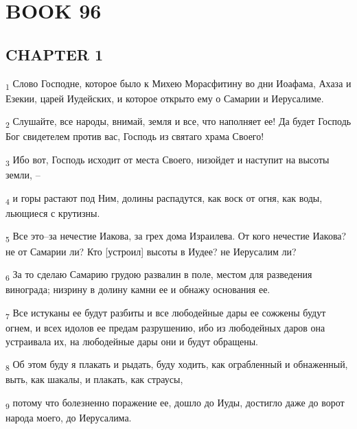 \section{BOOK 96}
\subsection{CHAPTER 1}
\begin{tcolorbox}
\textsubscript{1} Слово Господне, которое было к Михею Морасфитину во дни Иоафама, Ахаза и Езекии, царей Иудейских, и которое открыто ему о Самарии и Иерусалиме.
\end{tcolorbox}
\begin{tcolorbox}
\textsubscript{2} Слушайте, все народы, внимай, земля и все, что наполняет ее! Да будет Господь Бог свидетелем против вас, Господь из святаго храма Своего!
\end{tcolorbox}
\begin{tcolorbox}
\textsubscript{3} Ибо вот, Господь исходит от места Своего, низойдет и наступит на высоты земли, --
\end{tcolorbox}
\begin{tcolorbox}
\textsubscript{4} и горы растают под Ним, долины распадутся, как воск от огня, как воды, льющиеся с крутизны.
\end{tcolorbox}
\begin{tcolorbox}
\textsubscript{5} Все это--за нечестие Иакова, за грех дома Израилева. От кого нечестие Иакова? не от Самарии ли? Кто [устроил] высоты в Иудее? не Иерусалим ли?
\end{tcolorbox}
\begin{tcolorbox}
\textsubscript{6} За то сделаю Самарию грудою развалин в поле, местом для разведения винограда; низрину в долину камни ее и обнажу основания ее.
\end{tcolorbox}
\begin{tcolorbox}
\textsubscript{7} Все истуканы ее будут разбиты и все любодейные дары ее сожжены будут огнем, и всех идолов ее предам разрушению, ибо из любодейных даров она устраивала их, на любодейные дары они и будут обращены.
\end{tcolorbox}
\begin{tcolorbox}
\textsubscript{8} Об этом буду я плакать и рыдать, буду ходить, как ограбленный и обнаженный, выть, как шакалы, и плакать, как страусы,
\end{tcolorbox}
\begin{tcolorbox}
\textsubscript{9} потому что болезненно поражение ее, дошло до Иуды, достигло даже до ворот народа моего, до Иерусалима.
\end{tcolorbox}
